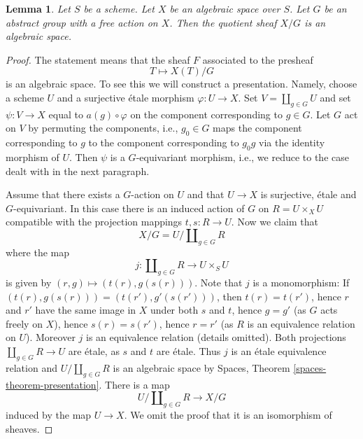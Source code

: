 \documentclass{stacks-project}
\theoremstyle{plain}
\newtheorem{lemma}[subsection]{Lemma}
\theoremstyle{definition}
\theoremstyle{remark}
\numberwithin{equation}{subsection}
\begin{document}
\begin{lemma}
\label{lemma-quotient}
Let $S$ be a scheme.
Let $X$ be an algebraic space over $S$.
Let $G$ be an abstract group with a free action on $X$.
Then the quotient sheaf $X/G$ is an algebraic space.
\end{lemma}

\begin{proof}
The statement means that the sheaf $F$ associated to the presheaf
$$
T \longmapsto X(T)/G
$$
is an algebraic space. To see this we will construct a presentation.
Namely, choose a scheme $U$ and a surjective \'etale morphism
$\varphi : U \to X$. Set $V = \coprod_{g \in G} U$ and set
$\psi : V \to X$ equal to $a(g) \circ \varphi$ on the component corresponding
to $g \in G$. Let $G$ act on $V$ by permuting the components, i.e.,
$g_0 \in G$ maps the component corresponding to $g$ to the component
corresponding to $g_0g$ via the identity morphism of $U$.
Then $\psi$ is a $G$-equivariant morphism, i.e., we reduce to the
case dealt with in the next paragraph.

\medskip\noindent
Assume that there exists a $G$-action on $U$ and that $U \to X$ is surjective,
\'etale and $G$-equivariant. In this case there is an induced
action of $G$ on $R = U \times_X U$ compatible with the projection
mappings $t, s : R \to U$. Now we claim that
$$
X/G = U/\coprod\nolimits_{g \in G} R
$$
where the map
$$
j : \coprod\nolimits_{g \in G} R
\longrightarrow
U \times_S U
$$
is given by $(r, g) \mapsto (t(r), g(s(r)))$. Note that $j$ is a monomorphism:
If $(t(r), g(s(r))) = (t(r'), g'(s(r')))$, then
$t(r) = t(r')$, hence $r$ and $r'$ have the same image in $X$ under
both $s$ and $t$, hence $g = g'$ (as $G$ acts freely on $X$), hence
$s(r) = s(r')$, hence $r = r'$ (as $R$ is an equivalence relation on $U$).
Moreover $j$ is an equivalence relation (details omitted).
Both projections $\coprod\nolimits_{g \in G} R \to U$ are \'etale, as
$s$ and $t$ are \'etale. Thus $j$ is an \'etale equivalence relation
and $U/\coprod\nolimits_{g \in G} R$ is an algebraic space by
Spaces, Theorem \ref{spaces-theorem-presentation}.
There is a map
$$
U/\coprod\nolimits_{g \in G} R \longrightarrow X/G
$$
induced by the map $U \to X$. We omit the proof that it is an
isomorphism of sheaves.
\end{proof}










\end{document}

